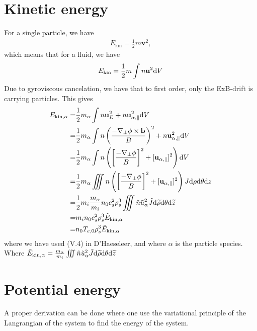 \section{Kinetic energy}
For a single particle, we have
%
\begin{align*}
E_{\text{kin}} = \frac{1}{2}m\mathbf{v}^2,
\end{align*}
%
which means that for a fluid, we have
%
\begin{align*}
E_{\text{kin}}=\frac{1}{2}m\int n\mathbf{u}^2 \text{d} V
\end{align*}
%
Due to gyroviscous cancelation, we have that to first order, only the ExB-drift
is carrying particles. This gives
%
\begin{align*}
    E_{\text{kin},\alpha}
    =& \frac{1}{2}m_{\alpha}\int
       n\mathbf{u}_E^2
       + n\mathbf{u}_{\alpha,\parallel}^2 \text{d} V
     \\
    =& \frac{1}{2}m_{\alpha}\int
       n\left(\frac{-\nabla_\perp\phi
              \times\mathbf{b}}{B}\right)^2
       + n\mathbf{u}_{\alpha,\parallel}^2 \text{d} V
    \\
    =& \frac{1}{2}m_{\alpha}\int
       n\left(\left[\frac{-\nabla_\perp\phi}{B}\right]^2
       + [\mathbf{u}_{\alpha,\parallel}]^2\right) \text{d} V
   \\
    =& \frac{1}{2}m_{\alpha}\iiint
       n\left(\left[\frac{-\nabla_\perp\phi}{B}\right]^2
       + [\mathbf{u}_{\alpha,\parallel}]^2\right)
       J \text{d}\rho \text{d}\theta \text{d} z
    \\
    =& \frac{1}{2}m_i\frac{m_{\alpha}}{m_i}
       n_0c_s^2\rho_s^3
       \iiint
       \tilde{n}\tilde{u}_\alpha^2
       \tilde{J} \text{d} \widetilde{ \rho} \text{d}\theta \text{d} \widetilde{ z}
    \\
    =& m_in_0c_s^2\rho_s^3 \tilde{E}_{\text{kin},\alpha}
    \\
    =& n_0T_{e,0}\rho_s^3 \tilde{E}_{\text{kin},\alpha}
\end{align*}
%
where we have used (V.4) in D'Haeseleer, and where $\alpha$ is the
particle species. Where
$\tilde{E}_{\text{kin},\alpha} =
\frac{m_{\alpha}}{m_i}\iiint \tilde{n}\tilde{u}_\alpha^2 \tilde{J} \text{d} \widetilde{ \rho} \text{d}\theta \text{d} \widetilde{ z}$

\section{Potential energy}
A proper derivation can be done where one use the variational principle of the
Langrangian of the system to find the energy of the system.

